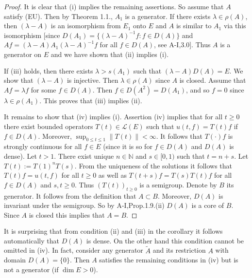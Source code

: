 \begin{proof}
It is clear that (i) implies the remaining assertions.
So assume that $A$ satisfy (EU).
Then by Theorem 1.1., $A_{1}$ is a generator.
If there exists $\lambda \in \rho(A)$, then $(\lambda-A)$ is an isomorphism from $E_{1}$ onto $E$ and $A$ is similar to $A_{1}$ via this isomorphism [since $D(A_{1}) = \{(\lambda-A)^{-1}f : f \in D(A)\}$ and $Af = (\lambda-A)A_{1}(\lambda-A)^{-1}f$ for all $f \in D(A)$, see A-I,3.0].
Thus $A$ is a generator on $E$ and we have shown that (ii) implies (i).

If (iii) holds, then there exists $\lambda > s(A_{1})$ such that $(\lambda-A)D(A) = E$.
We show that $(\lambda-A)$ is injective.
Then $\lambda \in \rho(A)$ since $A$ is closed.
Assume that $Af = \lambda f$ for some $f \in D(A)$.
Then $f \in D(A^{2}) = D(A_{1})$, and so $f = 0$ since $\lambda \in \rho(A_{1})$.
This proves that (iii) implies (ii).



It remains to show that (iv) implies (i).
Assertion (iv) implies that for all $t \geq 0$ there exist bounded operators $T(t) \in \mathcal{L}(E)$ such that $u(t,f) = T(t)f$ if $f \in D(A)$.
Moreover, $\sup_{0\leq t\leq1} \|T(t)\| < \infty$.
It follows that $T(\cdot)f$ is strongly continuous for all $f \in E$ (since it is so for $f \in D(A)$ and $D(A)$ is dense).
Let $t > 1$.
There exist unique $n \in \mathbb{N}$ and $s \in [0,1)$ such that $t = n + s$.
Let $T(t) := T(1)^{n}T(s)$.
From the uniqueness of the solutions it follows that $T(t)f = u(t,f)$ for all $t \geq 0$ as well as $T(t+s)f = T(s)T(t)f$ for all $f \in D(A)$ and $s,t \geq 0$.
Thus $(T(t))_{t\geq0}$ is a semigroup.
Denote by $B$ its generator.
It follows from the definition that $A \subset B$.
Moreover, $D(A)$ is invariant under the semigroup.
So by A-I,Prop.1.9.(ii) $D(A)$ is a core of $B$.
Since $A$ is closed this implies that $A = B$.
\end{proof}

\begin{remark}\label{rem:1.3}
It is surprising that from condition (ii) and (iii) in the corollary it follows automatically that $D(A)$ is dense.
On the other hand this condition cannot be omitted in (iv).
In fact, consider any generator $\tilde{A}$ and its restriction $A$ with domain $D(A) = \{0\}$.
Then $A$ satisfies the remaining conditions in (iv) but is not a generator (if $\dim E > 0$).
\end{remark}

